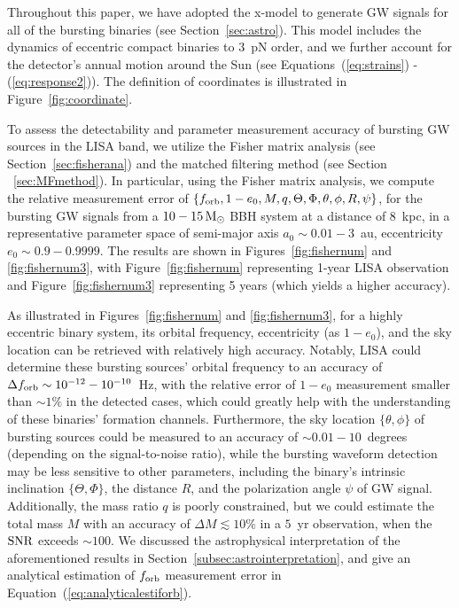 \documentclass[%
 reprint,
 amsmath,amssymb,
 aps,
]{revtex4-2}
\begin{document}
Throughout this paper, we have adopted the x-model to generate GW signals for all of the bursting binaries (see Section~\ref{sec:astro}). This model includes the dynamics of eccentric compact binaries to $3$~pN order, and we further account for the detector's annual motion around the Sun (see Equations~(\ref{eq:strains}) - (\ref{eq:response2})). The definition of coordinates is illustrated in Figure~\ref{fig:coordinate}. 


To assess the detectability and parameter measurement accuracy of bursting GW sources in the LISA band, we utilize the Fisher matrix analysis (see Section~\ref{sec:fisherana}) and the matched filtering method (see Section ~\ref{sec:MFmethod}). 
In particular, using the Fisher matrix analysis, we compute the relative measurement error of $\left\{f_{\rm orb}, 1-e_0, M, q, \Theta, \Phi, \theta,\phi, R,\psi \right\}$, for the bursting GW signals from a $10-15\,{\rm M_{\odot}}$ BBH system at a distance of $8$~kpc, in a representative parameter space of semi-major axis $a_0\sim 0.01-3$~au, eccentricity $e_0\sim 0.9-0.9999$. The results are shown in Figures~\ref{fig:fishernum} and \ref{fig:fishernum3}, with Figure~\ref{fig:fishernum} representing 1-year LISA observation and Figure~\ref{fig:fishernum3} representing 5 years (which yields a higher accuracy). 


As illustrated in Figures~\ref{fig:fishernum} and \ref{fig:fishernum3}, for a highly eccentric binary system, its orbital frequency, eccentricity (as $1-e_0$), and the sky location can be retrieved with relatively high accuracy. Notably, LISA could determine these bursting sources' orbital frequency to an accuracy of $\Delta f_{\rm orb}\sim 10^{-12}-10^{-10}$~Hz, with the relative error of $1-e_0$ measurement smaller than $\sim 1\%$ in the detected cases, which could greatly help with the understanding of these binaries' formation channels. Furthermore, the sky location $\{\theta, \phi\}$ of bursting sources could be measured to an accuracy of $\sim 0.01-10$~degrees (depending on the signal-to-noise ratio), while the bursting waveform detection may be less sensitive to other parameters, including the binary's intrinsic inclination $\{\Theta, \Phi\}$, the distance $R$, and the polarization angle $\psi$ of GW signal. Additionally, the mass ratio $q$ is poorly constrained, but we could estimate the total mass $M$ with an accuracy of $\Delta M \lesssim 10\%$ in a $5$~yr observation, when the $\rm SNR$ exceeds $\sim 100$. We discussed the astrophysical interpretation of the aforementioned results in Section~\ref{subsec:astrointerpretation}, and give an analytical estimation of $f_{\rm orb}$ measurement error in Equation~(\ref{eq:analyticalestiforb}).
\end{document}

